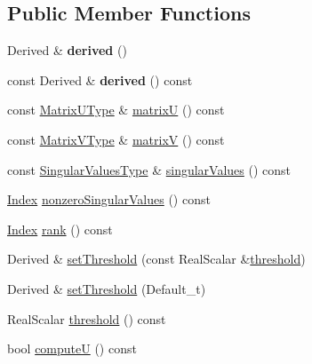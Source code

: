 \subsection*{Public Member Functions}
\begin{DoxyCompactItemize}
\item 
\mbox{\label{class_eigen_1_1_s_v_d_base_ab6cdcd4fb99772cf36e7fe2dac0bd847}} 
Derived \& {\bfseries derived} ()
\item 
\mbox{\label{class_eigen_1_1_s_v_d_base_ae888cfb7f9faf8bbd12ee943c8cbf2b2}} 
const Derived \& {\bfseries derived} () const
\item 
const \mbox{\hyperlink{class_eigen_1_1_matrix}{Matrix\+U\+Type}} \& \mbox{\hyperlink{class_eigen_1_1_s_v_d_base_afc7fe1546b0f6e1801b86f22f5664cb8}{matrixU}} () const
\item 
const \mbox{\hyperlink{class_eigen_1_1_matrix}{Matrix\+V\+Type}} \& \mbox{\hyperlink{class_eigen_1_1_s_v_d_base_a245a453b5e7347f737295c23133238c4}{matrixV}} () const
\item 
const \mbox{\hyperlink{struct_eigen_1_1internal_1_1true__type}{Singular\+Values\+Type}} \& \mbox{\hyperlink{class_eigen_1_1_s_v_d_base_a4e7bac123570c348f7ed6be909e1e474}{singular\+Values}} () const
\item 
\mbox{\hyperlink{class_eigen_1_1_s_v_d_base_a6229a37997eca1072b52cca5ee7a2bec}{Index}} \mbox{\hyperlink{class_eigen_1_1_s_v_d_base_afe8a555f38393a319a71ec0f0331c9ef}{nonzero\+Singular\+Values}} () const
\item 
\mbox{\hyperlink{class_eigen_1_1_s_v_d_base_a6229a37997eca1072b52cca5ee7a2bec}{Index}} \mbox{\hyperlink{class_eigen_1_1_s_v_d_base_a30b89e24f42f1692079eea31b361d26a}{rank}} () const
\item 
Derived \& \mbox{\hyperlink{class_eigen_1_1_s_v_d_base_a1c95d05398fc15e410a28560ef70a5a6}{set\+Threshold}} (const Real\+Scalar \&\mbox{\hyperlink{class_eigen_1_1_s_v_d_base_a98b2ee98690358951807353812a05c69}{threshold}})
\item 
Derived \& \mbox{\hyperlink{class_eigen_1_1_s_v_d_base_a27586b69dbfb63f714d1d45fd6304f97}{set\+Threshold}} (Default\+\_\+t)
\item 
Real\+Scalar \mbox{\hyperlink{class_eigen_1_1_s_v_d_base_a98b2ee98690358951807353812a05c69}{threshold}} () const
\item 
bool \mbox{\hyperlink{class_eigen_1_1_s_v_d_base_a705a7c2709e1624ccc19aa748a78d473}{computeU}} () const

\end{DoxyCompactItemize}
